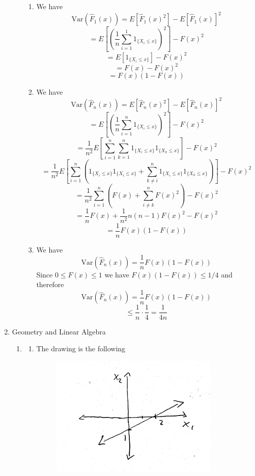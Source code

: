 \documentclass[submit]{harvardml}
\begin{document}
\begin{enumerate}
\begin{enumerate}
\begin{enumerate}
      \item
      We have
      $$\mathrm{Var}(\hat{F}_1(x)) = E[\hat{F}_1(x)^2] - E[\hat{F}_1(x)]^2$$
      $$= E\left[\left(\frac{1}{n} \sum_{i=1}^1 1_{\{X_i\leq x\}}\right)^2\right] - F(x)^2$$
      $$= E\left[1_{\{X_i\leq x\}}\right] - F(x)^2$$
      $$= F(x) - F(x)^2$$
      $$= F(x)(1-F(x))$$

      \item
      We have
      $$\mathrm{Var}(\hat{F}_n(x)) = E[\hat{F}_n(x)^2] - E[\hat{F}_n(x)]^2$$
      $$= E\left[\left(\frac{1}{n} \sum_{i=1}^n 1_{\{X_i\leq x\}}\right)^2\right] - F(x)^2$$
      $$= \frac{1}{n^2} E\left[\sum_{i=1}^n \sum_{k=1}^n 1_{\{X_i\leq x\}} 1_{\{X_k\leq x\}} \right] - F(x)^2$$
      $$= \frac{1}{n^2} E\left[\sum_{i=1}^n \left( 1_{\{X_i\leq x\}} 1_{\{X_i\leq x\}} + \sum_{k\neq i}^n 1_{\{X_i\leq x\}} 1_{\{X_k\leq x\}} \right) \right] - F(x)^2$$
      $$= \frac{1}{n^2} \sum_{i=1}^n \left( F(x) + \sum_{i\neq k}^n F(x)^2 \right) - F(x)^2$$
      $$= \frac{1}{n} F(x) + \frac{1}{n^2} n (n-1) F(x)^2 - F(x)^2$$
      $$= \frac{1}{n} F(x)(1-F(x))$$

      \item
      We have 
      $$\mathrm{Var}(\hat{F}_n(x))  = \frac{1}{n} F(x)(1-F(x)) $$
      Since $0\leq F(x)\leq 1$ we have $F(x)(1-F(x)) \leq 1/4$ and therefore
      $$\mathrm{Var}(\hat{F}_n(x))  = \frac{1}{n} F(x)(1-F(x))$$
      $$ \leq \frac{1}{n}\cdot\frac{1}{4} = \frac{1}{4n} $$
    \end{enumerate}
  \end{enumerate}

\item Geometry and Linear Algebra
\begin{enumerate}
  \item
  \begin{enumerate}
    \item 
    The drawing is the following
    \begin{figure}[h]
    \includegraphics[width=8cm]{ps0_5_1_a}
    \centering
    \end{figure}


\end{enumerate}
\end{enumerate}
\end{enumerate}
\end{document}
